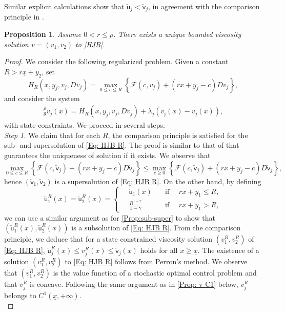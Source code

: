 \documentclass[11pt]{article}
\numberwithin{equation}{section}
\newtheorem{prop}[thm]{Proposition}
\theoremstyle{definition}
\def\su{{\mathsf{u}}}
\def\sv{{\mathsf{v}}}
\newcommand{\ux}{{\underline x}}
\newcommand{\beq}{\begin{equation}}
\newcommand{\eeq}{\end{equation}}
\newcommand{\g}{\gamma}
\newcommand{\lc}{\left(}
\newcommand{\rc}{\right)}
\theoremstyle{plain}
\begin{document}
Similar explicit calculations show that $\check{\su}_j<\check{\sv}_j$, in agreement with the comparison principle in . 
{}{
\begin{prop}\label{Prop: Exist}
Assume $0<r\leq \rho$. There exists a unique bounded viscosity solution $v=(v_1,v_2)$ to \eqref{HJB}. 
\end{prop}
\begin{proof}
We consider the following regularized problem. Given a constant $R>r\ux+y_2$, set 
$$
H_R(x,y_j,v_j,Dv_j)=\max_{0\leq c\leq R} \left\{ \mathcal{F}(c,v_j) +(rx +y_j- c)Dv_j \right\},
$$
and consider the system
\beq\label{Eq: HJB R}
	\begin{aligned}
	\frac{\rho}{\theta} v_j(x)=H_R(x,y_j,v_j,Dv_j)+\lambda_j(v_{\bar \jmath}(x)-v_j(x)),
	\end{aligned}
	\eeq
with state constraints. We proceed in several steps. \\
{\it{Step 1.}} We claim that for each $R$, the comparison principle is satisfied for the sub- and supersolution of \cref{Eq: HJB R}. The proof is similar to that of  that guarantees the uniqueness of solution if it exists. We observe that 
$$
\max_{0\leq c\leq R} \left\{ \mathcal{F}(c,\check{\sv}_j) +(rx +y_j- c)D\check{\sv}_j \right\}\leq \max_{c\geq 0} \left\{ \mathcal{F}(c,\check{\sv}_j) +(rx +y_j- c)D\check{\sv}_j \right\},
$$
hence $(\check{\sv}_1,\check{\sv}_2)$ is a supersolution of \cref{Eq: HJB R}. On the other hand, by defining
$$
\check{\su}^R_1(x)=\check{\su}^R_2(x)
=\left\{
      \begin{aligned}
       \quad \check{\su}_1(x) \quad & \text{if }\quad rx+y_1\leq R,\\
       \quad \frac{R^{1-\g}}{1-\g} \quad  & \text{if }\quad rx+y_1> R,
     \end{aligned}
   \right.
$$
we can use a similar argument as for \cref{Prop:sub-super} to show that $(\check{\su}^R_1(x),\check{\su}^R_2(x))$ is a subsolution of \cref{Eq: HJB R}. From the comparison principle, we deduce that for a state constrained viscosity solution $\lc v^R_1,v^R_2\rc $ of \cref{Eq: HJB R}, $\check{\su}^R_j(x)\leq v^R_j(x)\leq \check{\sv}_j(x)$ holds for all $x\geq \ux$. The existence of a solution $\lc v^R_1,v^R_2\rc $ to \cref{Eq: HJB R} follows from Perron's method. We observe that $\lc v^R_1,v^R_2\rc$ is the value function of a stochastic optimal control problem and that $v^R_j$ is concave. Following the same argument as in \cref{Prop: v C1} below, $v^R_j$ belongs to $C^1(\ux,+\infty)$. \\

\end{proof}}
\end{document}
